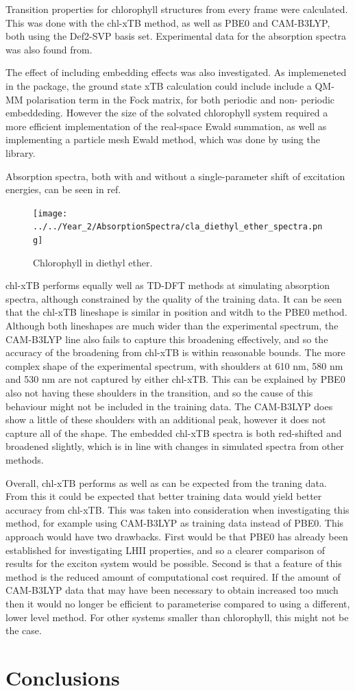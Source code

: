 Transition properties for chlorophyll structures from every frame were calculated.
This was done with the chl-xTB method, as well as PBE0 and CAM-B3LYP, both using 
the Def2-SVP basis set. Experimental data for the absorption spectra was also found
from.

The effect of including embedding effects was also investigated. As implemeneted
in the  package, the ground state xTB calculation could include
include a QM-MM polarisation term in the Fock matrix, for both periodic and non-
periodic embeddeding. However the size of the solvated chlorophyll system required 
a more efficient implementation of the real-space Ewald summation, as well as implementing
a particle mesh Ewald method, which was done by using the  library.

Absorption spectra, both with and without a single-parameter shift of excitation
energies, can be seen in ref. 

\begin{figure}
    \centering
    \texttt{[image: ../../Year\_2/AbsorptionSpectra/cla\_diethyl\_ether\_spectra.png]}
    \caption{Chlorophyll in diethyl ether.}
    \label{fig:chl_diethyl_ether}
\end{figure}

chl-xTB performs equally well as TD-DFT methods at simulating absorption
spectra, although constrained by the quality of the training data.
It can be seen that the chl-xTB lineshape is similar in position and witdh to the
PBE0 method. Although both lineshapes are much wider than the experimental spectrum,
the CAM-B3LYP line also fails to capture this broadening effectively, and so the
accuracy of the broadening from chl-xTB is within reasonable bounds.
The more complex shape of the experimental spectrum, with shoulders at 610 nm,
580 nm and 530 nm are not captured by either chl-xTB. This can be explained by PBE0
also not having these shoulders in the \Qy transition, and so the cause of this
behaviour might not be included in the training data. The CAM-B3LYP does show a
little of these shoulders with an additional peak, however it does not capture 
all of the shape.
The embedded chl-xTB spectra is both red-shifted and broadened slightly, which is
in line with changes in simulated spectra from other methods.

Overall, chl-xTB performs as well as can be expected from the traning data. From
this it could be expected that better training data would yield better accuracy
from chl-xTB. This was taken into consideration when investigating this method,
for example using CAM-B3LYP as training data instead of PBE0. This approach would
have two drawbacks. First would be that PBE0 has already been established for investigating
LHII properties, and so a clearer comparison of results for the exciton system would
be possible. Second is that a feature of this method is the reduced amount of 
computational cost required. If the amount of CAM-B3LYP data that may have been 
necessary to obtain increased too much then it would no longer be efficient to 
parameterise compared to using a different, lower level method. For other systems
smaller than chlorophyll, this might not be the case.

\section{Conclusions}


